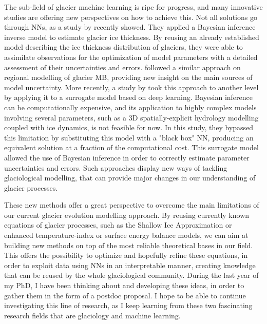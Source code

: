 The sub-field of glacier machine learning is ripe for progress, and many innovative studies are offering new perspectives on how to achieve this. Not all solutions go through NNs, as a study by \citet{werder_bayesian_2019} recently showed. They applied a Bayesian inference inverse model to estimate glacier ice thickness. By reusing an already established model describing the ice thickness distribution of glaciers, they were able to assimilate observations for the optimization of model parameters with a detailed assessment of their uncertainties and errors. \citet{rounce_quantifying_2020} followed a similar approach on regional modelling of glacier MB, providing new insight on the main sources of model uncertainty. More recently, a study by \citet{brinkerhoff_constraining_2020} took this approach to another level by applying it to a surrogate model based on deep learning. Bayesian inference can be computationally expensive, and its application to highly complex models involving several parameters, such as a 3D spatially-explicit hydrology modelling coupled with ice dynamics, is not feasible for now. In this study, they bypassed this limitation by substituting this model with a "black box" NN, producing an equivalent solution at a fraction of the computational cost. This surrogate model allowed the use of Bayesian inference in order to correctly estimate parameter uncertainties and errors. Such approaches display new ways of tackling glaciological modelling, that can provide major changes in our understanding of glacier processes. 

These new methods offer a great perspective to overcome the main limitations of our current glacier evolution modelling approach. By reusing currently known equations of glacier processes, such as the Shallow Ice Approximation \citep{hutter_theoretical_1983} or enhanced temperature-index or surface energy balance models, we can aim at building new methods on top of the most reliable theoretical bases in our field. This offers the possibility to optimize and hopefully refine these equations, in order to exploit data using NNs in an interpretable manner, creating knowledge that can be reused by the whole glaciological community. During the last year of my PhD, I have been thinking about and developing these ideas, in order to gather them in the form of a postdoc proposal. I hope to be able to continue investigating this line of research, as I keep learning from these two fascinating research fields that are glaciology and machine learning. 

